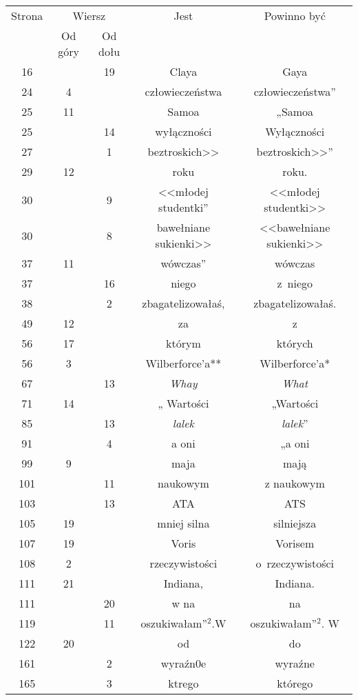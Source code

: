 \documentclass[a4paper,11pt]{article}
\numberwithin{equation}{section}
\begin{document}
\begin{center}

  \begin{tabular}{|c|c|c|c|c|}
    \hline
    Strona & \multicolumn{2}{c|}{Wiersz} & Jest
                              & Powinno być \\ \cline{2-3}
    & Od góry & Od dołu & & \\
    \hline
    16  & & 19 & Claya & Gaya \\
    24  &  4 & & człowieczeństwa & człowieczeństwa” \\
    25  & 11 & & Samoa & „Samoa \\
    25  & & 14 & wyłączności & Wyłączności \\
    27  & &  1 & beztroskich>> & beztroskich>>” \\
    29  & 12 & & roku & roku. \\
    30  & &  9 & <<młodej studentki” %
           & <<młodej studentki>> \\
    30  & &  8 & bawełniane sukienki>> & <<bawełniane sukienki>> \\
    37  & 11 & & wówczas” & wówczas \\
    37  & & 16 & niego & z~niego \\
    38  & &  2 & zbagatelizowałaś, & zbagatelizowałaś. \\
    49  & 12 & & za & z \\
    56  & 17 & & którym & których \\
    56  &  3 & & Wilberforce'a** & Wilberforce'a* \\
    67  & & 13 & \textit{Whay} & \textit{What} \\
    71  & 14 & & „ Wartości & „Wartości \\
    85  & & 13 & \textit{lalek} & \textit{lalek}” \\
    91  & &  4 & a oni & „a oni \\
    99  &  9 & & maja & mają \\
    101 & & 11 & naukowym & z naukowym \\
    103 & & 13 & ATA & ATS \\
    105 & 19 & & mniej silna & silniejsza \\
    107 & 19 & & Voris & Vorisem \\
    108 &  2 & & rzeczywistości & o~rzeczywistości \\
    111 & 21 & & Indiana, & Indiana. \\
    111 & & 20 & w na & na \\
    119 & & 11 & oszukiwałam”$^{ 2 }$.W & oszukiwałam”$^{ 2 }$. W \\
    122 & 20 & & od & do \\
    161 & &  2 & wyraźn0e & wyraźne \\
    165 & &  3 & ktrego & którego \\
    \hline
  \end{tabular}






\end{center}
\end{document}
